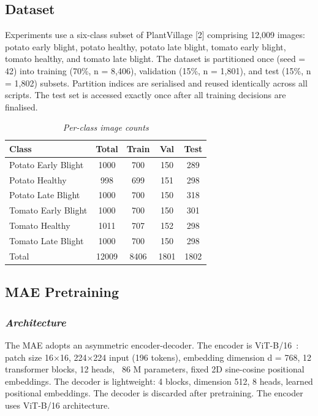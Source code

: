 \documentclass[conference]{IEEEtran}
\begin{document}
\subsection{Dataset}

Experiments use a six-class subset of PlantVillage [2] comprising 12,009 images: potato early blight, potato healthy, potato late blight, tomato early blight, tomato healthy, and tomato late blight. The dataset is partitioned once (seed = 42) into training (70\%, n = 8,406), validation (15\%, n = 1,801), and test (15\%, n = 1,802) subsets. Partition indices are serialised and reused identically across all scripts. The test set is accessed exactly once after all training decisions are finalised.

\begin{table}[H]
\centering
\caption{\textit{Per-class image counts}}
\begin{tabular}{lcccc}
\toprule
Class & Total & Train & Val & Test\\
\midrule
Potato Early Blight & 1000 & 700 & 150 & 289\\
Potato Healthy & 998 & 699 & 151 & 298\\
Potato Late Blight & 1000 & 700 & 150 & 318\\
Tomato Early Blight & 1000 & 700 & 150 & 301\\
Tomato Healthy & 1011 & 707 & 152 & 298\\
Tomato Late Blight & 1000 & 700 & 150 & 298\\
\midrule
Total & 12009 & 8406 & 1801 & 1802\\
\bottomrule
\end{tabular}
\end{table}

\subsection{MAE Pretraining}
\subsubsection{\textit{\textbf{Architecture}}}
The MAE adopts an asymmetric encoder-decoder. The encoder is ViT-B/16~\cite{3}: patch size 16×16, 224×224 input (196 tokens), embedding dimension d = 768, 12 transformer blocks, 12 heads, ~86 M parameters, fixed 2D sine-cosine positional embeddings. The decoder is lightweight: 4 blocks, dimension 512, 8 heads, learned positional embeddings. The decoder is discarded after pretraining.
The encoder uses ViT-B/16 architecture.
\vspace{0.5em}
\end{document}
